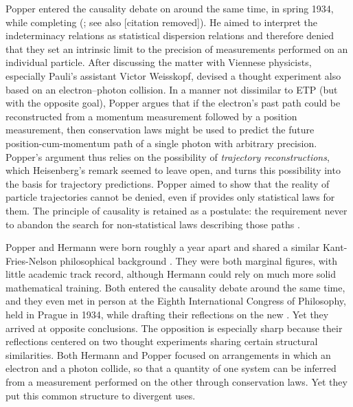 \documentclass[pdflatex]{sn-jnl}
\renewcommand{\cite}{\citealp}
\newcommand{\LdF}{\bt{Logik der Forschung}\xspace}
\newcommand{\TE}{thought experiment\xspace}
\newcommand{\IR}{indeterminacy relations\xspace}
\begin{document}
Popper entered the causality debate on \qm around the same time, in spring 1934, while completing \LdF (\cite[237--38]{Hacohen2010-06-11}; see also [citation removed]). He aimed to interpret the \IR as statistical dispersion relations and therefore denied that they set an intrinsic limit to the precision of measurements performed on an individual particle. After discussing the matter with Viennese physicists, especially Pauli's assistant Victor Weisskopf, \citet{Popper1934} devised a \TE also based on an electron--photon collision. In a manner not dissimilar to ETP (but with the opposite goal), Popper argues that if the electron's past path could be reconstructed from a momentum measurement followed by a position measurement, then conservation laws might be used to predict the future position-cum-momentum path of a single photon with arbitrary precision. Popper's argument thus relies on the possibility of \emph{trajectory reconstructions}, which Heisenberg's  remark seemed to leave open, and turns this possibility into the basis for trajectory predictions. Popper aimed to show that the reality of particle trajectories cannot be denied, even if \qm provides only statistical laws for them. The principle of causality is retained as a postulate: the requirement never to abandon the search for non-statistical laws describing those paths \citep[\S78]{Popper1935}.

Popper and Hermann were born roughly a year apart and shared a similar Kant-Fries-Nelson philosophical background \citep{Milkov2012}. They were both marginal figures, with little academic track record, although Hermann could rely on much more solid mathematical training. Both entered the causality debate around the same time, and they even met in person at the Eighth International Congress of Philosophy, held in Prague in 1934, while drafting their reflections on the new \qm. Yet they arrived at opposite conclusions. The opposition is especially sharp because their reflections centered on two thought experiments sharing certain structural similarities. Both Hermann and Popper focused on arrangements in which an electron and a photon collide, so that a quantity of one system can be inferred from a measurement performed on the other through conservation laws. Yet they put this common structure to divergent uses.
\end{document}
